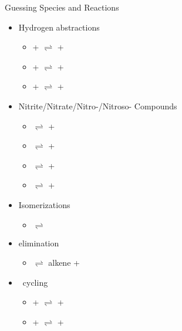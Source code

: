 \begin{frame}{Guessing Species and Reactions}

\vspace{-8mm}

    \begin{multicols}{2}
    \begin{itemize}
        \item Hydrogen abstractions
        \begin{itemize}
            \item {} +  $\rightleftharpoons$  + 
            \item {} +  $\rightleftharpoons$  + 
            \item {} +  $\rightleftharpoons$  + 
        \end{itemize}
        \item Nitrite/Nitrate/Nitro-/Nitroso- Compounds
        \begin{itemize}
            \item {} $\rightleftharpoons$  + 
            \item {} $\rightleftharpoons$  + 
            \item {} $\rightleftharpoons$  + 
            \item {} $\rightleftharpoons$  + 
        \end{itemize}
        \item Isomerizations  
        \begin{itemize}
            \item {} $\rightleftharpoons$ 
        \end{itemize}
        \item {} elimination
        \begin{itemize}
            \item {} $\rightleftharpoons$ alkene + 
        \end{itemize}
        \item \nox\ cycling
        \begin{itemize}
            \item {} +  $\rightleftharpoons$  + 
            \item {} +  $\rightleftharpoons$  + 
        \end{itemize}
    \end{itemize}
    

\end{multicols}
\end{frame}
